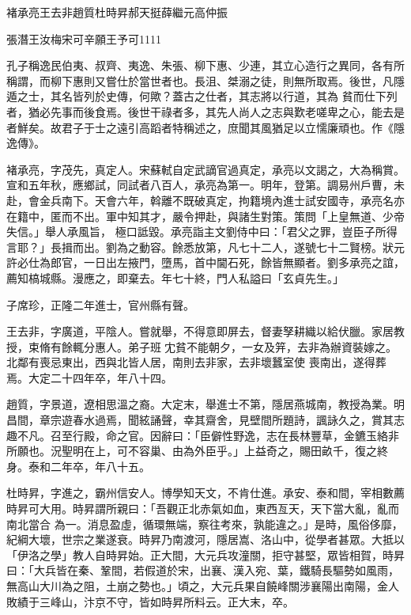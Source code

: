 \begin{pinyinscope}
 褚承亮王去非趙質杜時昇郝天挺薛繼元高仲振



 張潛王汝梅宋可辛願王予可1111



 孔子稱逸民伯夷、叔齊、夷逸、朱張、柳下惠、少連，其立心造行之異同，各有所稱謂，而柳下惠則又嘗仕於當世者也。長沮、桀溺之徒，則無所取焉。後世，凡隱遁之士，其名皆列於史傳，何歟？蓋古之仕者，其志將以行道，其為
 貧而仕下列者，猶必先事而後食焉。後世干祿者多，其先人尚人之志與歎老嗟卑之心，能去是者鮮矣。故君子于士之遠引高蹈者特稱述之，庶聞其風猶足以立懦廉頑也。作《隱逸傳》。



 褚承亮，字茂先，真定人。宋蘇軾自定武謫官過真定，承亮以文謁之，大為稱賞。宣和五年秋，應鄉試，同試者八百人，承亮為第一。明年，登第。調易州戶曹，未赴，會金兵南下。天會六年，斡離不既破真定，拘籍境內進士試安國寺，承亮名亦在籍中，匿而不出。軍中知其才，嚴令押赴，與諸生對策。策問「上皇無道、少帝失信。」舉人承風旨，
 極口詆毀。承亮詣主文劉侍中曰：「君父之罪，豈臣子所得言耶？」長揖而出。劉為之動容。餘悉放第，凡七十二人，遂號七十二賢榜。狀元許必仕為郎官，一日出左掖門，墮馬，首中閫石死，餘皆無顯者。劉多承亮之誼，薦知槁城縣。漫應之，即棄去。年七十終，門人私謚曰「玄貞先生。」



 子席珍，正隆二年進士，官州縣有聲。



 王去非，字廣道，平陰人。嘗就舉，不得意即屏去，督妻孥耕織以給伏臘。家居教授，束脩有餘輒分惠人。弟子班冘貧不能朝夕，一女及笄，去非為辦資裝嫁之。北鄰有喪忌東出，西與北皆人居，南則去非家，去非壞蠶室使
 喪南出，遂得葬焉。大定二十四年卒，年八十四。



 趙質，字景道，遼相思溫之裔。大定末，舉進士不第，隱居燕城南，教授為業。明昌間，章宗遊春水過焉，聞絃誦聲，幸其齋舍，見壁間所題詩，諷詠久之，賞其志趣不凡。召至行殿，命之官。因辭曰：「臣僻性野逸，志在長林豐草，金鑣玉絡非所願也。況聖明在上，可不容巢、由為外臣乎。」上益奇之，賜田畝千，復之終身。泰和二年卒，年八十五。



 杜時昇，字進之，霸州信安人。博學知天文，不肯仕進。承安、泰和間，宰相數薦時昇可大用。時昇謂所親曰：「吾觀正北赤氣如血，東西亙天，天下當大亂，亂而南北當合
 為一。消息盈虛，循環無端，察往考來，孰能違之。」是時，風俗侈靡，紀綱大壞，世宗之業遂衰。時昇乃南渡河，隱居嵩、洛山中，從學者甚眾。大抵以「伊洛之學」教人自時昇始。正大間，大元兵攻潼關，拒守甚堅，眾皆相賀，時昇曰：「大兵皆在秦、鞏間，若假道於宋，出襄、漢入宛、葉，鐵騎長驅勢如風雨，無高山大川為之阻，土崩之勢也。」頃之，大元兵果自饒峰關涉襄陽出南陽，金人敗績于三峰山，汴京不守，皆如時昇所料云。正大末，卒。




\end{pinyinscope}
